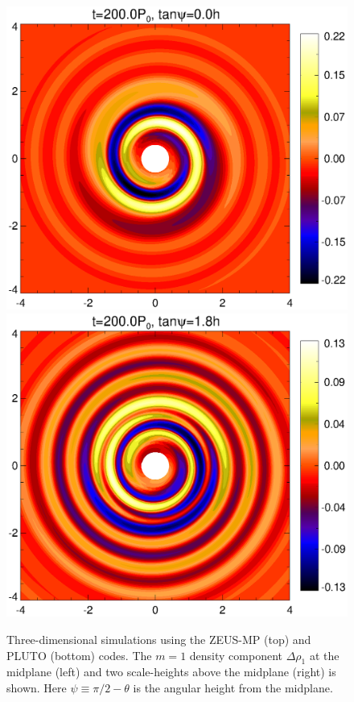 \begin{figure}
\begin{center}
{      \includegraphics[scale=0.305,clip=true,trim=0cm 0cm 0cm 0cm]{figures/pdiskxy_023_z0}
      \includegraphics[scale=0.305,clip=true,trim=0.8cm 0cm 0cm
      0cm]{figures/pdiskxy_023_zmax}
    }
  \end{center}
  \caption{Three-dimensional simulations using the ZEUS-MP (top) and 
    PLUTO (bottom) codes. The $m=1$ density component $\Delta\rho_1$ at the midplane (left) and
    two scale-heights above the midplane (right) is shown. Here $\psi
    \equiv \pi/2 - \theta$ is the angular height  
    from the midplane. \label{3d_prelim}}   
\end{figure}

